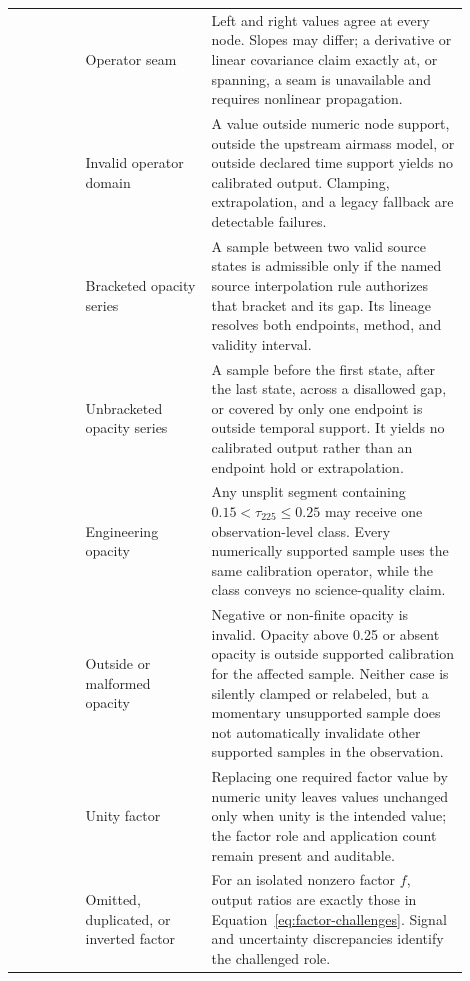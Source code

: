 \begin{longtable}{L{0.14\linewidth}L{0.25\linewidth}L{0.51\linewidth}}
 & Operator seam & Left and right values agree at every node. Slopes
may differ; a derivative or linear covariance claim exactly at, or spanning,
a seam is unavailable and requires nonlinear propagation. \\

 & Invalid operator domain & A value outside numeric node support,
outside the upstream airmass model, or outside declared time support yields no
calibrated output. Clamping, extrapolation, and a legacy fallback are
detectable failures. \\

 & Bracketed opacity series & A sample between two valid source
states is admissible only if the named source interpolation rule authorizes
that bracket and its gap. Its lineage resolves both endpoints, method, and
validity interval. \\

 & Unbracketed opacity series & A sample before the first state,
after the last state, across a disallowed gap, or covered by only one endpoint
is outside temporal support. It yields no calibrated output rather than an
endpoint hold or extrapolation. \\

 & Engineering opacity & Any unsplit segment containing
\(0.15<\tau_{225}\leq0.25\) may receive one observation-level
 class. Every numerically supported sample uses the
same calibration operator, while the class conveys no science-quality claim. \\

 & Outside or malformed opacity & Negative or non-finite opacity is
invalid. Opacity above 0.25 or absent opacity is outside supported
calibration for the affected sample. Neither case is silently clamped or
relabeled, but a momentary unsupported sample does not automatically
invalidate other supported samples in the observation. \\

 & Unity factor & Replacing one required factor value by numeric
unity leaves values unchanged only when unity is the intended value; the
factor role and application count remain present and auditable. \\

 & Omitted, duplicated, or inverted factor & For an isolated
nonzero factor \(f\), output ratios are exactly those in
Equation~\eqref{eq:factor-challenges}. Signal and uncertainty discrepancies
identify the challenged role. \\


\end{longtable}
